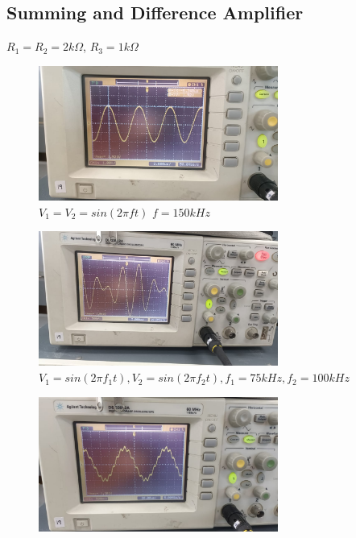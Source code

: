 \documentclass[a4paper,12pt]{article}
\begin{document}
\subsection*{Summing and Difference Amplifier}
$R_1=R_2=2k\Omega$, $R_3=1k\Omega$
\begin{figure}[H]
    \centering
    \includegraphics[width=0.7\textwidth]{figs/5.1/1.jpeg}
        \caption{$V_1=V_2=sin(2\pi ft)$ $f=150kHz$}
\end{figure}
\begin{figure}[H]
    \centering
    \includegraphics[width=0.7\textwidth]{figs/5.1/2.jpeg}
        \caption{$V_1=sin(2\pi f_1t), V_2=sin(2\pi f_2t), f_1=75kHz, f_2=100kHz$}
\end{figure}
\begin{figure}[H]
    \centering
    \includegraphics[width=0.7\textwidth]{figs/5.1/3.jpeg}
\end{figure}
\end{document}
